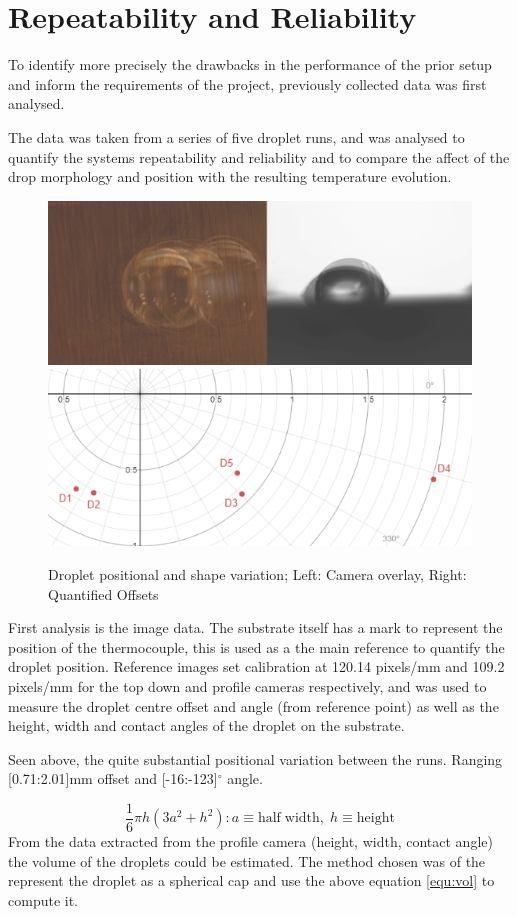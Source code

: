 \section{Repeatability and Reliability}
To identify more precisely the drawbacks in the performance of the prior setup and inform the requirements of the project, previously collected data was first analysed.

The data was taken from a series of five droplet runs, and was analysed to quantify the systems repeatability and reliability and to compare the affect of the drop morphology and position with the resulting temperature evolution.

\begin{figure}[h]
    \begin{center}
        \includegraphics[width=.4\textwidth]{img/droplets_2018.png}
        \includegraphics[width=.4\textwidth]{img/drop_pos_2018.png}
        \caption{Droplet positional and shape variation; Left: Camera overlay, Right: Quantified Offsets}
    \end{center}
\end{figure}

First analysis is the image data. The substrate itself has a mark to represent the position of the thermocouple, this is used as a the main reference to quantify the droplet position. Reference images set calibration at 120.14 pixels/mm and 109.2 pixels/mm for the top down and profile cameras respectively, and was used to measure the droplet centre offset and angle (from reference point) as well as the height, width and contact angles of the droplet on the substrate.

Seen above, the quite substantial positional variation between the runs. Ranging [0.71:2.01]mm offset and [-16:-123]$^\circ$ angle.


\begin{equation}
    \frac{1}{6}\pi h(3a^2 + h^2)
    : a \equiv \mathrm{half \; width}, \; h \equiv \mathrm{height}
    \label{equ:vol}
\end{equation}
From the data extracted from the profile camera (height, width, contact angle) the volume of the droplets could be estimated. The method chosen was of the represent the droplet as a spherical cap and use the above equation \ref{equ:vol} to compute it.

